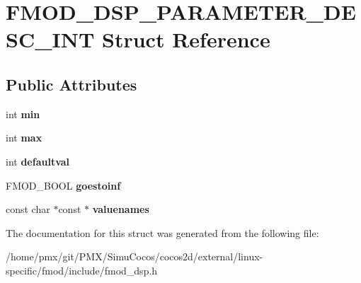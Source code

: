 \hypertarget{structFMOD__DSP__PARAMETER__DESC__INT}{}\section{F\+M\+O\+D\+\_\+\+D\+S\+P\+\_\+\+P\+A\+R\+A\+M\+E\+T\+E\+R\+\_\+\+D\+E\+S\+C\+\_\+\+I\+NT Struct Reference}
\label{structFMOD__DSP__PARAMETER__DESC__INT}
\subsection*{Public Attributes}
\begin{DoxyCompactItemize}
\item 
\mbox{\label{structFMOD__DSP__PARAMETER__DESC__INT_a9d7c1b248835dacf48225e3515d7e1ec}} 
int {\bfseries min}
\item 
\mbox{\label{structFMOD__DSP__PARAMETER__DESC__INT_aa88a36d6f2818f8aef53a40720705491}} 
int {\bfseries max}
\item 
\mbox{\label{structFMOD__DSP__PARAMETER__DESC__INT_a49d300c5e15b78a2d6e8a81ece927dba}} 
int {\bfseries defaultval}
\item 
\mbox{\label{structFMOD__DSP__PARAMETER__DESC__INT_ac6ce0578fcab081c13a0b737553cea5c}} 
F\+M\+O\+D\+\_\+\+B\+O\+OL {\bfseries goestoinf}
\item 
\mbox{\label{structFMOD__DSP__PARAMETER__DESC__INT_a892935bc83d2ce90b9790eae6622bf7c}} 
const char $\ast$const  $\ast$ {\bfseries valuenames}
\end{DoxyCompactItemize}


The documentation for this struct was generated from the following file\+:\begin{DoxyCompactItemize}
\item 
/home/pmx/git/\+P\+M\+X/\+Simu\+Cocos/cocos2d/external/linux-\/specific/fmod/include/fmod\+\_\+dsp.\+h\end{DoxyCompactItemize}

